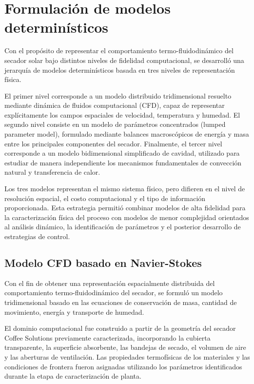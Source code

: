 \section{Formulación de modelos determinísticos}

Con el propósito de representar el comportamiento termo-fluidodinámico del secador solar bajo distintos niveles de fidelidad computacional, se desarrolló una jerarquía de modelos determinísticos basada en tres niveles de representación física.

El primer nivel corresponde a un modelo distribuido tridimensional resuelto mediante dinámica de fluidos computacional (CFD), capaz de representar explícitamente los campos espaciales de velocidad, temperatura y humedad. El segundo nivel consiste en un modelo de parámetros concentrados (lumped parameter model), formulado mediante balances macroscópicos de energía y masa entre los principales componentes del secador. Finalmente, el tercer nivel corresponde a un modelo bidimensional simplificado de cavidad, utilizado para estudiar de manera independiente los mecanismos fundamentales de convección natural y transferencia de calor.

Los tres modelos representan el mismo sistema físico, pero difieren en el nivel de resolución espacial, el costo computacional y el tipo de información proporcionada. Esta estrategia permitió combinar modelos de alta fidelidad para la caracterización física del proceso con modelos de menor complejidad orientados al análisis dinámico, la identificación de parámetros y el posterior desarrollo de estrategias de control.

\subsection{Modelo CFD basado en Navier-Stokes}
Con el fin de obtener una representación espacialmente distribuida del comportamiento termo-fluidodinámico del secador, se formuló un modelo tridimensional basado en las ecuaciones de conservación de masa, cantidad de movimiento, energía y transporte de humedad.

El dominio computacional fue construido a partir de la geometría del secador Coffee Solutions previamente caracterizada, incorporando la cubierta transparente, la superficie absorbente, las bandejas de secado, el volumen de aire y las aberturas de ventilación. Las propiedades termofísicas de los materiales y las condiciones de frontera fueron asignadas utilizando los parámetros identificados durante la etapa de caracterización de planta.

